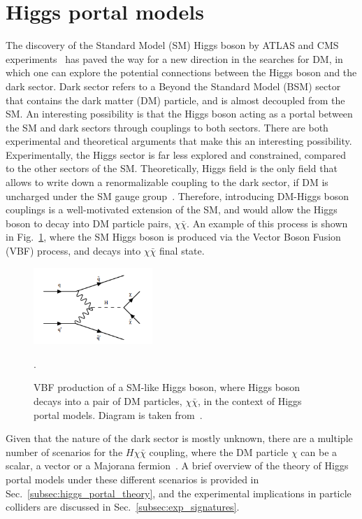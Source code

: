 \section{Higgs portal models}

\graphicspath{{1_TheoreticalBackground/Figures/HiggsPortal}}

The discovery of the Standard Model (SM) Higgs boson by ATLAS and CMS experiments~\cite{Nisati:2015iwc} has paved the way for a new direction
in the searches for DM, in which one can explore the potential connections between the Higgs boson and the dark sector.
Dark sector refers to a Beyond the Standard Model (BSM) sector that contains the dark matter (DM) particle, and is almost decoupled from 
the SM. An interesting possibility is that the Higgs boson acting as a portal between the SM and dark sectors through
couplings to both sectors. There are both experimental and theoretical arguments that make this an interesting possibility.
Experimentally, the Higgs sector is far less explored and constrained, compared to the other sectors of the SM. Theoretically,
Higgs field is the only field that allows to write down a renormalizable
coupling to the dark sector, if DM is uncharged under the SM gauge group~\cite{Argyropoulos:2021sav}. Therefore, introducing 
DM-Higgs boson couplings is a well-motivated extension of the SM, and would allow the Higgs boson to decay into DM particle
pairs, $\chi \bar{\chi}$. An example of this process is shown in Fig.~\ref{fig:vbfhinv_signal_diag}, where the SM Higgs boson
is produced via the Vector Boson Fusion (VBF) process, and decays into $\chi\bar{\chi}$ final state.

\begin{figure}[htbp]
    \centering
    \includegraphics[width=0.4\textwidth]{vbf_signal_diagram.png}
    \caption{VBF production of a SM-like Higgs boson, where Higgs boson decays into a pair of DM particles, $\chi\bar{\chi}$,
    in the context of Higgs portal models. Diagram is taken from~\cite{VBFHinvAnalysisPaper}.}.
    \label{fig:vbfhinv_signal_diag}
\end{figure}

Given that the nature of the dark sector is mostly unknown, there are a multiple number of scenarios for the $H \chi \bar{\chi}$ coupling,
where the DM particle $\chi$ can be a scalar, a vector or a Majorana fermion~\cite{Djouadi:2011aa}. A brief overview of the 
theory of Higgs portal models under these different scenarios is provided in Sec.~\ref{subsec:higgs_portal_theory}, and the experimental
implications in particle colliders are discussed in Sec.~\ref{subsec:exp_signatures}.

